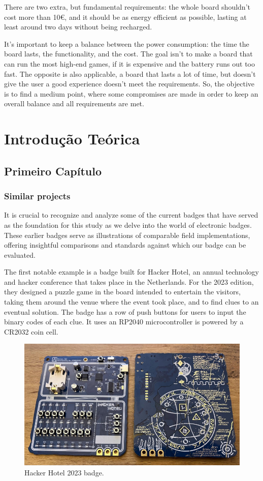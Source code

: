 \documentclass[portuguese]{ist-thesis}
\begin{document}
There are two extra, but fundamental requirements: the whole board shouldn't cost more than 10€, and it should be as energy efficient as possible, lasting at least around two days without being recharged. 

It's important to keep a balance between the power consumption: the time the board lasts, the functionality, and the cost. The goal isn't to make a board that can run the most high-end games, if it is expensive and the battery runs out too fast. The opposite is also applicable, a board that lasts a lot of time, but doesn't give the user a good experience doesn't meet the requirements. So, the objective is to find a medium point, where some compromises are made in order to keep an overall balance and all requirements are met.  

\part{Introdução Teórica}

\chapter{Primeiro Capítulo}

\section{Similar projects}

It is crucial to recognize and analyze some of the current badges that have served as the foundation for this study as we delve into the world of electronic badges. These earlier badges serve as illustrations of comparable field implementations, offering insightful comparisons and standards against which our badge can be evaluated. 

The first notable example is a badge built for Hacker Hotel, an annual technology and hacker conference that takes place in the Netherlands. For the 2023 edition, they designed a puzzle game in the board intended to entertain the visitors, taking them around the venue where the event took place, and to find clues to an eventual solution. The badge has a row of push buttons for users to input the binary codes of each clue. It uses an RP2040 microcontroller is powered by a CR2032 coin cell. 

\begin{figure}[ht]
	\centering
	\includegraphics[width = 0.8\linewidth]{images/hacker_hotel.jpg}
	\caption{Hacker Hotel 2023 badge.}
	\label{fig:hacker_hotel}
\end{figure}
\end{document}
